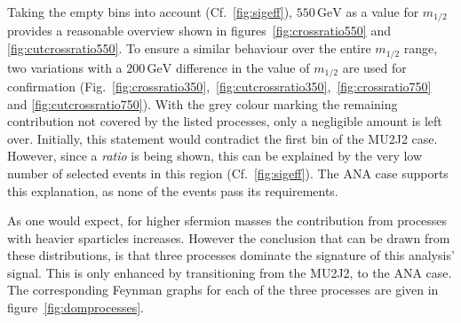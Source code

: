 Taking the empty bins into account (Cf.~\ref{fig:sigeff}), $550\,\text{GeV}$ as a value for $m_{1/2}$ provides a reasonable overview shown in figures~\ref{fig:crossratio550} and \ref{fig:cutcrossratio550}. To ensure a similar behaviour over the entire $m_{1/2}$ range, two variations with a $200\,\text{GeV}$ difference in the value of $m_{1/2}$ are used for confirmation (Fig.~\ref{fig:crossratio350},~\ref{fig:cutcrossratio350},~\ref{fig:crossratio750} and \ref{fig:cutcrossratio750}). With the grey colour marking the remaining contribution not covered by the listed processes, only a negligible amount is left over. Initially, this statement would contradict the first bin of the MU2J2 case. However, since a \textit{ratio} is being shown, this can be explained by the very low number of selected events in this region (Cf.~\ref{fig:sigeff}). The ANA case supports this explanation, as none of the events pass its requirements.

As one would expect, for higher sfermion masses the contribution from processes with heavier sparticles increases. However the conclusion that can be drawn from these distributions, is that three processes dominate the signature of this analysis' signal. This is only enhanced by transitioning from the MU2J2, to the ANA case. The corresponding Feynman graphs for each of the three processes are given in figure~\ref{fig:domprocesses}.

